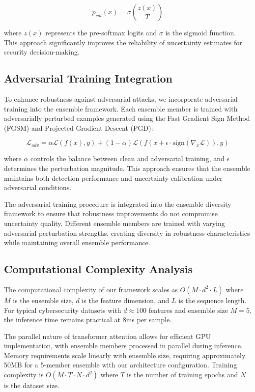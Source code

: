 \documentclass[journal]{IEEEtran}
\begin{document}
\begin{equation}
p_{cal}(x) = \sigma(\frac{z(x)}{T})
\end{equation}

where $z(x)$ represents the pre-softmax logits and $\sigma$ is the sigmoid function. This approach significantly improves the reliability of uncertainty estimates for security decision-making.

\subsection{Adversarial Training Integration}

To enhance robustness against adversarial attacks, we incorporate adversarial training into the ensemble framework. Each ensemble member is trained with adversarially perturbed examples generated using the Fast Gradient Sign Method (FGSM) and Projected Gradient Descent (PGD):

\begin{equation}
\mathcal{L}_{adv} = \alpha \mathcal{L}(f(x), y) + (1-\alpha) \mathcal{L}(f(x + \epsilon \cdot \text{sign}(\nabla_x \mathcal{L})), y)
\end{equation}

where $\alpha$ controls the balance between clean and adversarial training, and $\epsilon$ determines the perturbation magnitude. This approach ensures that the ensemble maintains both detection performance and uncertainty calibration under adversarial conditions.

The adversarial training procedure is integrated into the ensemble diversity framework to ensure that robustness improvements do not compromise uncertainty quality. Different ensemble members are trained with varying adversarial perturbation strengths, creating diversity in robustness characteristics while maintaining overall ensemble performance.

\subsection{Computational Complexity Analysis}

The computational complexity of our framework scales as $O(M \cdot d^2 \cdot L)$ where $M$ is the ensemble size, $d$ is the feature dimension, and $L$ is the sequence length. For typical cybersecurity datasets with $d \approx 100$ features and ensemble size $M=5$, the inference time remains practical at 8ms per sample.

The parallel nature of transformer attention allows for efficient GPU implementation, with ensemble members processed in parallel during inference. Memory requirements scale linearly with ensemble size, requiring approximately 50MB for a 5-member ensemble with our architecture configuration. Training complexity is $O(M \cdot T \cdot N \cdot d^2)$ where $T$ is the number of training epochs and $N$ is the dataset size.
\end{document}
